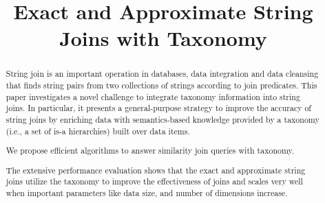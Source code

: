 \documentclass{sig-alternate}
\newcommand{\topkm}{\mbox{top-$k$,$m$}}
\begin{document}


\title{Exact and Approximate String Joins with Taxonomy}


\author{
}




\maketitle

\begin{abstract}

String join is an important operation in databases, data integration
and data cleansing that finds string pairs from
two collections of strings according to join predicates. This paper investigates a novel challenge to integrate taxonomy information into string joins. In particular, it presents a general-purpose strategy to improve the accuracy of string joins by enriching data with semantics-based knowledge provided by a
taxonomy (i.e., a set of is-a hierarchies) built over data items.


We propose efficient algorithms to answer similarity join queries with taxonomy.

The extensive performance evaluation shows that the exact and approximate string joins utilize the taxonomy to improve the effectiveness of joins  and scales very well when important parameters like  data size, and number of dimensions increase.


\end{abstract}
\end{document}
